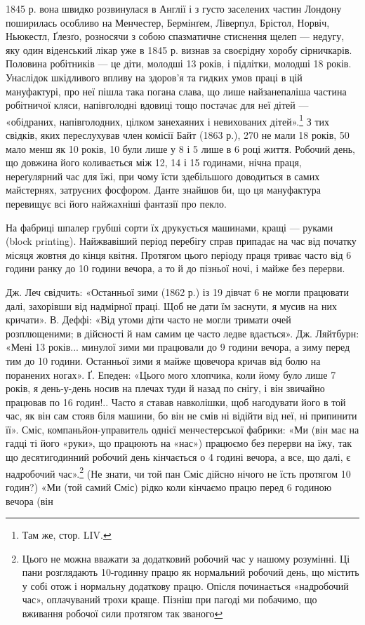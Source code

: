 \parcont{}  %
1845 р. вона швидко розвинулася в Англії і з густо заселених
частин Лондону поширилась особливо на Менчестер, Бермінґем,
Ліверпул, Брістол, Норвіч, Ньюкестл, Ґлезґо, розносячи з
собою спазматичне стиснення щелеп — недугу, яку один віденський
лікар уже в 1845 р. визнав за своєрідну хоробу сірничкарів.
Половина робітників — це діти, молодші 13 років, і
підлітки, молодші 18 років. Унаслідок шкідливого впливу на
здоров’я та гидких умов праці в цій мануфактурі, про неї пішла
така погана слава, що лише найзанепаліша частина робітничої
кляси, напівголодні вдовиці тощо постачає для неї дітей — «обідраних,
напівголодних, цілком занехаяних і невихованих дітей».\footnote{
Там же, стор. LIV.
}
З тих свідків, яких переслухував член комісії Байт (1863 р.),
270 не мали 18 років, 50 мало менш як 10 років, 10 були лише
у 8 і 5 лише в 6 році життя. Робочий день, що довжина його коливається
між 12, 14 і 15 годинами, нічна праця, нереґулярний
час для їжі, при чому їсти здебільшого доводиться в самих майстернях,
затруєних фосфором. Данте знайшов би, що ця мануфактура
перевищує всі його найжахніші фантазії про пекло.

На фабриці шпалер грубші сорти їх друкується машинами,
кращі — руками (block printing). Найжвавіший період перебігу
справ припадає на час від початку місяця жовтня до кінця
квітня. Протягом цього періоду праця триває часто від 6 години
ранку до 10 години вечора, а то й до пізньої ночі, і майже без
перерви.

Дж. Леч свідчить: «Останньої зими (1862 р.) із 19 дівчат 6
не могли працювати далі, захорівши від надмірної праці. Щоб не
дати їм заснути, я мусив на них кричати». В. Деффі: «Від утоми
діти часто не могли тримати очей розплющеними; в дійсності й
нам самим це часто ледве вдається». Дж. Ляйтбурн: «Мені
13 років... минулої зими ми працювали до 9 години вечора, а
зиму перед тим до 10 години. Останньої зими я майже щовечора
кричав від болю на поранених ногах». Ґ. Епеден: «Цього мого
хлопчика, коли йому було лише 7 років, я день-у-день носив
на плечах туди й назад по снігу, і він звичайно працював по
16 годин!.. Часто я ставав навколішки, щоб нагодувати його в той
час, як він сам стояв біля машини, бо він не смів ні відійти від
неї, ні припинити її». Сміс, компаньйон-управитель однієї
менчестерської фабрики: «Ми (він має на гадці ті його «руки»,
що працюють на «нас») працюємо без перерви на їжу, так що
десятигодинний робочий день кінчається о 4  годині вечора, а
все, що далі, є надробочий час».\footnote{
Цього не можна вважати за додатковий робочий час у нашому розумінні.
Ці пани розглядають 10-годинну працю як нормальний
робочий день, що містить у собі отож і нормальну додаткову працю. Опісля
починається «надробочий час», оплачуваний трохи краще. Пізніш при
пагоді ми побачимо, що вживання робочої сили протягом так званого
} (Не знати, чи той пан Сміс
дійсно нічого не їсть протягом  10 годин?) «Ми (той самий
Сміс) рідко коли кінчаємо працю перед 6 годиною вечора (він
\parbreak{}  %
